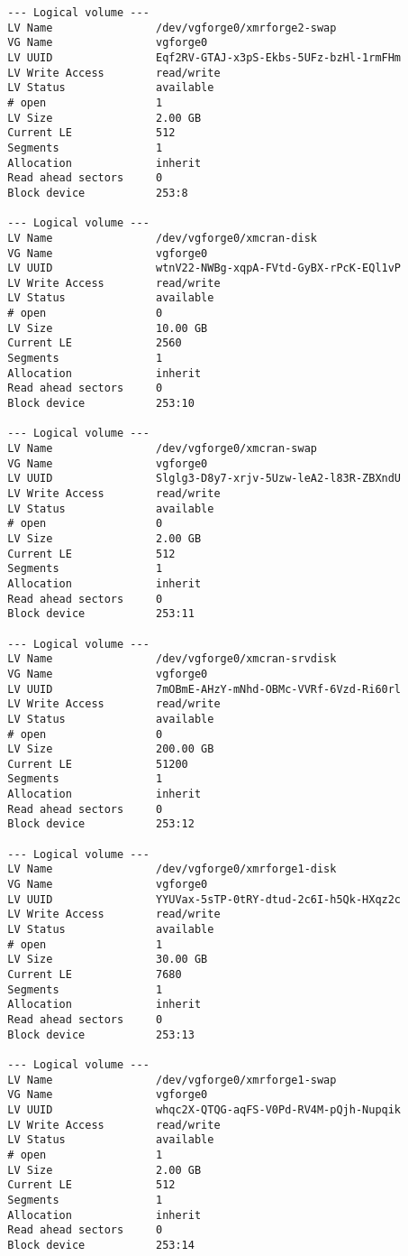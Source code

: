 \documentclass[a4paper]{article}
\begin{document}
\begin{lstlisting}
  --- Logical volume ---
  LV Name                /dev/vgforge0/xmrforge2-swap
  VG Name                vgforge0
  LV UUID                Eqf2RV-GTAJ-x3pS-Ekbs-5UFz-bzHl-1rmFHm
  LV Write Access        read/write
  LV Status              available
  # open                 1
  LV Size                2.00 GB
  Current LE             512
  Segments               1
  Allocation             inherit
  Read ahead sectors     0
  Block device           253:8
   
  --- Logical volume ---
  LV Name                /dev/vgforge0/xmcran-disk
  VG Name                vgforge0
  LV UUID                wtnV22-NWBg-xqpA-FVtd-GyBX-rPcK-EQl1vP
  LV Write Access        read/write
  LV Status              available
  # open                 0
  LV Size                10.00 GB
  Current LE             2560
  Segments               1
  Allocation             inherit
  Read ahead sectors     0
  Block device           253:10
   
  --- Logical volume ---
  LV Name                /dev/vgforge0/xmcran-swap
  VG Name                vgforge0
  LV UUID                Slglg3-D8y7-xrjv-5Uzw-leA2-l83R-ZBXndU
  LV Write Access        read/write
  LV Status              available
  # open                 0
  LV Size                2.00 GB
  Current LE             512
  Segments               1
  Allocation             inherit
  Read ahead sectors     0
  Block device           253:11
   
  --- Logical volume ---
  LV Name                /dev/vgforge0/xmcran-srvdisk
  VG Name                vgforge0
  LV UUID                7mOBmE-AHzY-mNhd-OBMc-VVRf-6Vzd-Ri60rl
  LV Write Access        read/write
  LV Status              available
  # open                 0
  LV Size                200.00 GB
  Current LE             51200
  Segments               1
  Allocation             inherit
  Read ahead sectors     0
  Block device           253:12
   
  --- Logical volume ---
  LV Name                /dev/vgforge0/xmrforge1-disk
  VG Name                vgforge0
  LV UUID                YYUVax-5sTP-0tRY-dtud-2c6I-h5Qk-HXqz2c
  LV Write Access        read/write
  LV Status              available
  # open                 1
  LV Size                30.00 GB
  Current LE             7680
  Segments               1
  Allocation             inherit
  Read ahead sectors     0
  Block device           253:13
   
  --- Logical volume ---
  LV Name                /dev/vgforge0/xmrforge1-swap
  VG Name                vgforge0
  LV UUID                whqc2X-QTQG-aqFS-V0Pd-RV4M-pQjh-Nupqik
  LV Write Access        read/write
  LV Status              available
  # open                 1
  LV Size                2.00 GB
  Current LE             512
  Segments               1
  Allocation             inherit
  Read ahead sectors     0
  Block device           253:14
\end{lstlisting}
\end{document}
